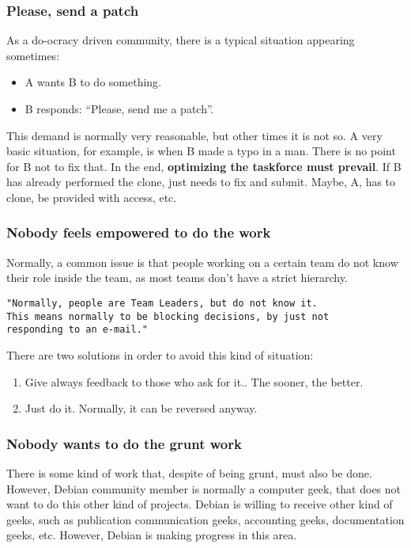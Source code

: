 \documentclass[11pt]{article}
\begin{document}
\subsubsection{Please, send a patch}
As a do-ocracy driven community, there is a typical situation appearing sometimes:
\begin{itemize}
\item{A wants B to do something}.
\item{B responds: ``Please, send me a patch''}.
\end{itemize}
This demand is normally very reasonable, but other times it is not so. A very basic situation, for example, is when B made a typo in a man. There is no point for B not to fix that. In the end, \textbf{optimizing the taskforce must prevail}. If B has already performed the clone, just needs to fix and submit. Maybe, A, has to clone, be provided with access, etc. 

\subsubsection{Nobody feels empowered to do the work}
Normally, a common issue is that people working on a certain team do not know their role inside the team, as most teams don't have a strict hierarchy.
\begin{verbatim}
"Normally, people are Team Leaders, but do not know it.
This means normally to be blocking decisions, by just not 
responding to an e-mail."
\end{verbatim}
There are two solutions in order to avoid this kind of situation:
\begin{enumerate}
\item{Give always feedback to those who ask for it.}. The sooner, the better.
\item{Just do it.} Normally, it can be reversed anyway.
\end{enumerate}

\subsubsection{Nobody wants to do the grunt work}
There is some kind of work that, despite of being grunt, must also be done. However, Debian community member is normally a computer geek, that does not want to do this other kind of projects. Debian is willing to receive other kind of geeks, such as publication communication geeks, accounting geeks, documentation geeks, etc. However, Debian is making progress in this area. 
\end{document}
